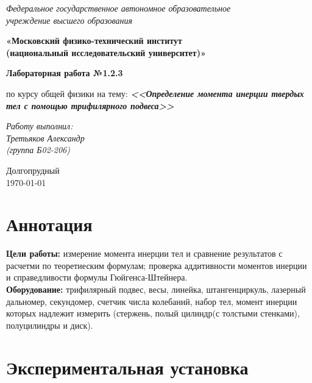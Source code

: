 \documentclass[a4paper,14pt]{extarticle}
\begin{document}
	\begin{center}
		\textit{Федеральное государственное автономное образовательное\\ учреждение высшего образования }
		
		\vspace{0.5ex}
		
		\textbf{«Московский физико-технический институт\\ (национальный исследовательский университет)»}
	\end{center}
	
	\vspace{10ex}
	
	
	\begin{center}
		\vspace{13ex}	
		\textbf{Лабораторная работа №1.2.3}	
		\vspace{1ex}
		
		по курсу общей физики		
		на тему:		
		\textbf{\textit{<<Определение момента инерции твердых тел с помощью трифилярного подвеса>>}}		
		\vspace{30ex}
		
		\begin{flushright}
			\noindent
			\textit{Работу выполнил:}\\  
			\textit{Третьяков Александр \\(группа Б02-206)}
		\end{flushright}
		\vfill
		Долгопрудный \\ \today
		
	\end{center}
	\newpage
	\section{Аннотация}

	\textbf{Цели работы:} измерение момента инерции тел и сравнение результатов с расчетми по теоретиеским формулам; проверка аддитивности моментов инерции и справедливости формулы Гюйгенса-Штейнера.\\
	\textbf{Оборудование:} трифилярный подвес, весы, линейка, штангенциркуль, лазерный дальномер, секундомер, счетчик числа колебаний, набор тел, момент инерции которых надлежит измерить (стержень, полый цилиндр(с толстыми стенками), полуцилиндры и диск).
	
	\section {Экспериментальная установка}
	
\end{document}
